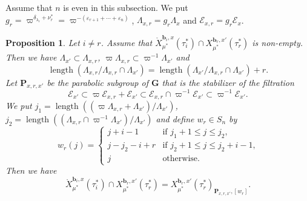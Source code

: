 \documentclass[12pt,a4paper]{article}
\newtheorem{prop}[thm]{Proposition}
\DeclareMathOperator{\length}{length}
\newcommand{\bfG}{\mathbf{G}}
\newcommand{\bfP}{\mathbf{P}}
\newcommand{\bfb}{\mathbf{b}}
\newcommand{\cE}{\mathcal{E}}
\begin{document}
Assume that $n$ is even in this subsection. 
We put $g_r=\varpi^{\delta_{\lambda_r} + \nu_r^*}=\varpi^{-(\varepsilon_{r+1} + \cdots + \varepsilon_n )}$, 
$\Lambda_{x,r}=g_r \Lambda_x$ and $\cE_{x,r}=g_r \cE_x$. 

\begin{prop}\label{prop:intnurxx'}
Let $i \neq r$. Assume that  
$\mathring{X}_{\mu^*}^{\bfb_i,x}(\tau_i^*) \cap X_{\mu^*}^{\bfb_r,x'}(\tau_r^*)$ 
is non-empty. 
Then we have 
$\Lambda_{x'} \subset \Lambda_{x,r}$,   
$\varpi \Lambda_{x,r} \subset \varpi^{-1} \Lambda_{x'}$ and 
\begin{equation}\label{eq:ExrEx'+r}
\length (\Lambda_{x,r}/\Lambda_{x,r} \cap \Lambda_{x'})=\length (\Lambda_{x'}/\Lambda_{x,r} \cap \Lambda_{x'}) +r.
\end{equation} 
Let $\bfP_{x,r,x'}$ be the parabolic subgroup of $\bfG$ that is the stabilizer of the filtration 
\[
 \cE_{x'} \subset \varpi \cE_{x,r} +\cE_{x'} \subset 
 \cE_{x,r} \cap \varpi^{-1} \cE_{x'} \subset \varpi^{-1} \cE_{x'}. 
\]
We put $j_1=\length ((\varpi \Lambda_{x,r} +\Lambda_{x'})/\Lambda_{x'})$, $j_2=\length ((\Lambda_{x,r} \cap \varpi^{-1} \Lambda_{x'})/\Lambda_{x'})$ and 
define $w_r \in S_n$ by 
\[
 w_r (j)=
 \begin{cases}
j+i-1 & \textrm{if $j_1 +1 \leq j \leq j_2$,}\\
j-j_2 -i +r & \textrm{if $j_2+1 \leq j \leq j_2+i -1$,}\\
j & \textrm{otherwise.}
 \end{cases}
\]
Then we have 
\[
 \mathring{X}_{\mu^*}^{\bfb_i,x}(\tau_i^*) \cap X_{\mu^*}^{\bfb_r,x'}(\tau_r^*) = X_{\mu^*}^{\bfb_r,x'}(\tau_r^*)_{\bfP_{x,r,x'},[w_r]}. 
\]
\end{prop}
\end{document}
